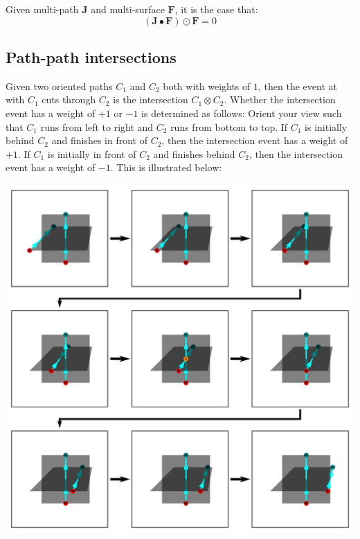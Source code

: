 \begin{thm}
Given multi-path \(\mathbf{J}\) and multi-surface \(\mathbf{F}\), it is the case that: 
\[(\mathbf{J} \bullet \mathbf{F}) \odot \mathbf{F} = 0\]
\end{thm}



\subsection{Path-path intersections}

Given two oriented paths \(C_1\) and \(C_2\) both with weights of \(1\), then the event at with \(C_1\) cuts through \(C_2\) is the intersection \(C_1 \otimes C_2\). Whether the intersection event has a weight of \(+1\) or \(-1\) is determined as follows: Orient your view such that \(C_1\) runs from left to right and \(C_2\) runs from bottom to top. If \(C_1\) is initially behind \(C_2\) and finishes in front of \(C_2\), then the intersection event has a weight of \(+1\). If \(C_1\) is initially in front of \(C_2\) and finishes behind \(C_2\), then the intersection event has a weight of \(-1\). This is illustrated below:    

\begin{center}
\includegraphics[width = \textwidth]{Time/path_path_intersections}
\end{center}


